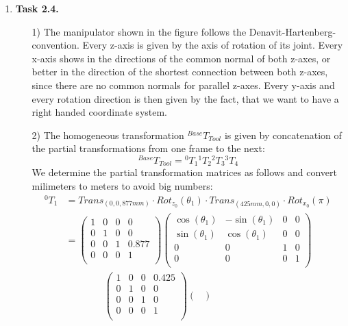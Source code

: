 \documentclass[a4paper,11pt]{article}
\begin{document}
\begin {enumerate}
\item[\textbf{Task 2.4.}]

    \begin{enumerate}
        \item[1)] The manipulator shown in the figure follows the Denavit-Hartenberg-convention. Every z-axis is given by the axis of rotation of its joint. Every x-axis shows in the directions of the common normal of both z-axes, or better in the direction of the shortest connection between both z-axes, since there are no common normals for parallel z-axes. Every y-axis and every rotation direction is then given by the fact, that we want to have a right handed coordinate system.
        \item[2)] The homogeneous transformation $^{Base}T_{Tool}$ is given by concatenation of the partial transformations from one frame to the next:
        $${^{Base}T_{Tool}} = {^0T_1}{^1T_2}{^2T_3}{^3T_4}$$
        We determine the partial transformation matrices as follows and convert milimeters to meters to avoid big numbers:
        \begin{align*}
        	{^0T_1} &= Trans_{(0,0,877mm)} \cdot Rot_{z_0}(\theta_1) \cdot Trans_{(425mm,0,0)} \cdot Rot_{x_0}(\pi)\\
        	&= \begin{pmatrix}
        		1 & 0 & 0 & 0\\
        		0 & 1 & 0 & 0\\
        		0 & 0 & 1 & 0.877\\
        		0 & 0 & 0 & 1\\
        	\end{pmatrix}        	
        	\begin{pmatrix}
        		\cos(\theta_1) & -\sin(\theta_1) & 0 & 0\\
        		\sin(\theta_1) & \cos(\theta_1) & 0 & 0\\
        		0 & 0 & 1 & 0\\
        		0 & 0 & 0 & 1\\
        	\end{pmatrix}\\
        	&\qquad\qquad \begin{pmatrix}
        		1 & 0 & 0 & 0.425\\
        		0 & 1 & 0 & 0\\
        		0 & 0 & 1 & 0\\
        		0 & 0 & 0 & 1\\
        	\end{pmatrix}
        	\begin{pmatrix}

\end{pmatrix}
\end{align*}
\end{enumerate}
\end{enumerate}
\end{document}
